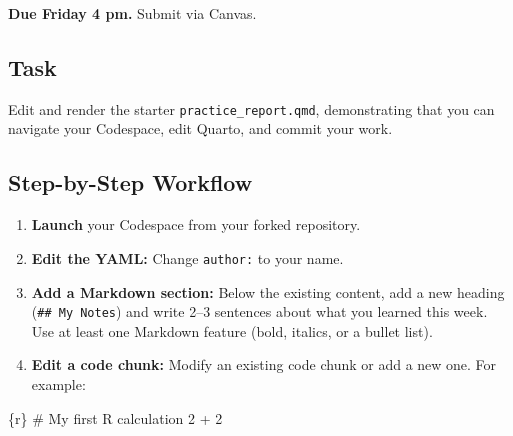\documentclass[
  letterpaper,
  DIV=11,
  numbers=noendperiod,
  oneside]{scrreprt}
\newenvironment{Shaded}{\begin{snugshade}}{\end{snugshade}}
\newcommand{\CommentTok}[1]{\textcolor[rgb]{0.37,0.37,0.37}{#1}}
\newcommand{\DecValTok}[1]{\textcolor[rgb]{0.68,0.00,0.00}{#1}}
\newcommand{\InformationTok}[1]{\textcolor[rgb]{0.37,0.37,0.37}{#1}}
\newcommand{\SpecialCharTok}[1]{\textcolor[rgb]{0.37,0.37,0.37}{#1}}
\providecommand{\tightlist}{%
  \setlength{\itemsep}{0pt}\setlength{\parskip}{0pt}}
\begin{document}

\textbf{Due Friday 4 pm.} Submit via Canvas.

\subsection*{Task}\label{task}

Edit and render the starter \texttt{practice\_report.qmd}, demonstrating
that you can navigate your Codespace, edit Quarto, and commit your work.

\subsection*{Step-by-Step Workflow}\label{step-by-step-workflow}

\begin{enumerate}
\def\labelenumi{\arabic{enumi}.}
\tightlist
\item
  \textbf{Launch} your Codespace from your forked repository.
\item
  \textbf{Edit the YAML:} Change \texttt{author:} to your name.
\item
  \textbf{Add a Markdown section:} Below the existing content, add a new
  heading (\texttt{\#\#\ My\ Notes}) and write 2--3 sentences about what
  you learned this week. Use at least one Markdown feature (bold,
  italics, or a bullet list).
\item
  \textbf{Edit a code chunk:} Modify an existing code chunk or add a new
  one. For example:
\end{enumerate}

\begin{Shaded}
\begin{Highlighting}[numbers=left,,]
\InformationTok{\textasciigrave{}\textasciigrave{}\textasciigrave{}\{r\}}
\CommentTok{\# My first R calculation}
\DecValTok{2} \SpecialCharTok{+} \DecValTok{2}
\InformationTok{\textasciigrave{}\textasciigrave{}\textasciigrave{}}
\end{Highlighting}
\end{Shaded}
\end{document}
